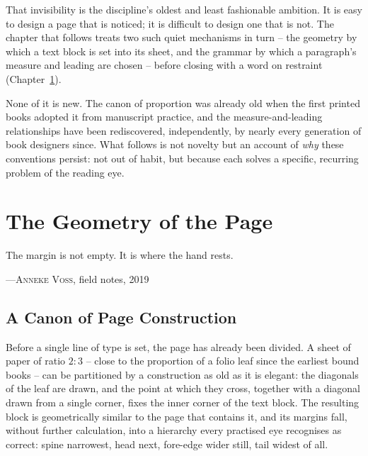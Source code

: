 \documentclass[11pt,paper=a4,footinclude=true,headinclude=true,open=any]{scrbook}
\begin{document}
That invisibility is the discipline's oldest and least fashionable ambition. It is easy to design a page that is noticed; it is difficult to design one that is not. The chapter that follows treats two such quiet mechanisms in turn -- the geometry by which a text block is set into its sheet, and the grammar by which a paragraph's measure and leading are chosen -- before closing with a word on restraint (Chapter~\ref{chap:geometry}).

None of it is new. The canon of proportion was already old when the first printed books adopted it from manuscript practice, and the measure-and-leading relationships have been rediscovered, independently, by nearly every generation of book designers since. What follows is not novelty but an account of \emph{why} these conventions persist: not out of habit, but because each solves a specific, recurring problem of the reading eye.

\chapter{The Geometry of the Page}
\label{chap:geometry}

\epigraph{The margin is not empty. It is where the hand rests.}{---\textsc{Anneke Voss}, field notes, 2019}

\section{A Canon of Page Construction}
\label{sec:canon}

Before a single line of type is set, the page has already been divided. A sheet of paper of ratio $2:3$ -- close to the proportion of a folio leaf since the earliest bound books -- can be partitioned by a construction as old as it is elegant: the diagonals of the leaf are drawn, and the point at which they cross, together with a diagonal drawn from a single corner, fixes the inner corner of the text block. The resulting block is geometrically similar to the page that contains it, and its margins fall, without further calculation, into a hierarchy every practised eye recognises as correct: spine narrowest, head next, fore-edge wider still, tail widest of all.
\end{document}
